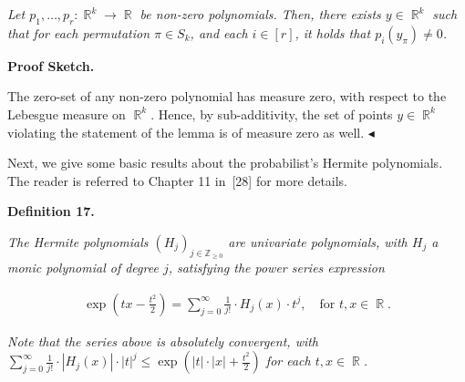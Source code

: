 \documentclass[10pt,a4paper]{article}
\begin{document}
\emph{Let $p_{1},\dots,p_{r}:\mathop{\mathbb{R}}^{k}\to\mathop{\mathbb{R}}$ be non-zero polynomials.
Then, there exists $y\in\mathop{\mathbb{R}}^{k}$ such that for each permutation $\pi\in S_{k}$, and each $i\in[r]$, it holds that $p_{i}(y_{\pi})\not=0$.}\par






\par\medskip\noindent\textbf{Proof Sketch.}\par




The zero-set of any non-zero polynomial has measure zero, with respect to the Lebesgue measure on $\mathop{\mathbb{R}}^{k}$.
Hence, by sub-additivity, the set of points $y\in\mathop{\mathbb{R}}^{k}$ violating the statement of the lemma is of measure zero as well.
$\blacktriangleleft$\par




Next, we give some basic results about the probabilist’s Hermite polynomials. The reader is referred to Chapter 11 in [28] for more details.\par





\par\medskip\noindent\textbf{
\textbf{Definition 17}\textbf{.}
}\par



\emph{The Hermite polynomials $(H_{j})_{j\in\mathbb{Z}_{\geqslant 0}}$ are univariate polynomials, with $H_{j}$ a monic polynomial of degree $j$, satisfying the power series expression}\par


\[\begin{gathered}
\exp\left(tx-\frac{t^{2}}{2}\right)=\sum_{j=0}^{\infty}\frac{1}{j!}\cdot H_{j}(x)\cdot t^{j},\quad\text{for }t,x\in\mathop{\mathbb{R}}.
\end{gathered}\]


\emph{Note that the series above is absolutely convergent, with $\sum_{j=0}^{\infty}\frac{1}{j!}\cdot\left|H_{j}(x)\right|\cdot\left|t\right|^{j}\leqslant\exp\left(\left|t\right|\cdot\left|x\right|+\frac{t^{2}}{2}\right)$ for each $t,x\in\mathop{\mathbb{R}}$.}\par
\end{document}
